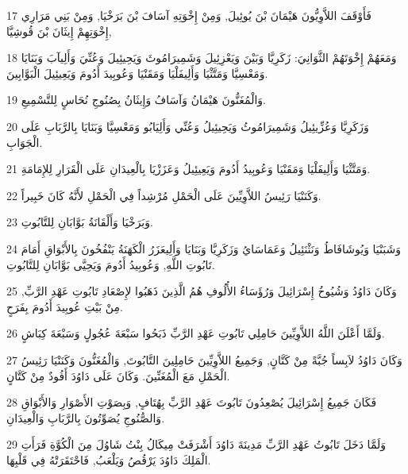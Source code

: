 \par 17 فَأَوْقَفَ اللاَّوِيُّونَ هَيْمَانَ بْنَ يُوئِيلَ, وَمِنْ إِخْوَتِهِ آسَافَ بْنَ بَرَخْيَا, وَمِنْ بَنِي مَرَارِي إِخْوَتِهِمْ إِيثَانَ بْنَ قُوشِيَّا,
\par 18 وَمَعَهُمْ إِخْوَتَهُمْ الثَّوَانِيَ: زَكَرِيَّا وَبَيْنَ وَيَعْزِئِيلَ وَشَمِيرَامُوثَ وَيَحِيئِيلَ وَعُنِّيَ وَأَلِيآبَ وَبَنَايَا وَمَعْسِيَّا وَمَتَّثْيَا وَأَلِيفَلْيَا وَمَقَنْيَا وَعُوبِيدَ أَدُومَ وَيَعِيئِيلَ الْبَوَّابِينَ.
\par 19 وَالْمُغَنُّونَ هَيْمَانُ وَآسَافُ وَإِيثَانُ بِصُنُوجِ نُحَاسٍ لِلتَّسْمِيعِ.
\par 20 وَزَكَرِيَّا وَعُزِّيئِيلُ وَشَمِيرَامُوثُ وَيَحِيئِيلُ وَعُنِّي وَأَلِيَابُو وَمَعْسِيَّا وَبَنَايَا بِالرَّبَابِ عَلَى الْجَوَابِ.
\par 21 وَمَتَّثْيَا وَأَلِيفَلْيَا وَمَقَنْيَا وَعُوبِيدُ أَدُومَ وَيَعِيئِيلُ وَعَزَزْيَا بِالْعِيدَانِ عَلَى الْقَرَارِ لِلإِمَامَةِ.
\par 22 وَكَنَنْيَا رَئِيسُ اللاَّوِيِّينَ عَلَى الْحَمْلِ مُرْشِداً فِي الْحَمْلِ لأَنَّهُ كَانَ خَبِيراً.
\par 23 وَبَرَخْيَا وَأَلْقَانَةُ بَوَّابَانِ لِلتَّابُوتِ.
\par 24 وَشَبَنْيَا وَيُوشَافَاطُ وَنَثْنَئِيلُ وَعَمَاسَايُ وَزَكَرِيَّا وَبَنَايَا وَأَلِيعَزَرُ الْكَهَنَةُ يَنْفُخُونَ بِالأَبْوَاقِ أَمَامَ تَابُوتِ اللَّهِ, وَعُوبِيدُ أَدُومَ وَيَحِيَّى بَوَّابَانِ لِلتَّابُوتِ.
\par 25 وَكَانَ دَاوُدُ وَشُيُوخُ إِسْرَائِيلَ وَرُؤَسَاءُ الأُلُوفِ هُمُ الَّذِينَ ذَهَبُوا لإِصْعَادِ تَابُوتِ عَهْدِ الرَّبِّ, مِنْ بَيْتِ عُوبِيدَ أَدُومَ بِفَرَحٍ.
\par 26 وَلَمَّا أَعْلَنَ اللَّهُ اللاَّوِيِّينَ حَامِلِي تَابُوتِ عَهْدِ الرَّبِّ ذَبَحُوا سَبْعَةَ عُجُولٍ وَسَبْعَةَ كِبَاشٍ.
\par 27 وَكَانَ دَاوُدُ لاَبِساً جُبَّةً مِنْ كَتَّانٍ, وَجَمِيعُ اللاَّوِيِّينَ حَامِلِينَ التَّابُوتَ, وَالْمُغَنُّونَ وَكَنَنْيَا رَئِيسُ الْحَمْلِ مَعَ الْمُغَنِّينَ. وَكَانَ عَلَى دَاوُدَ أَفُودٌ مِنْ كَتَّانٍ.
\par 28 فَكَانَ جَمِيعُ إِسْرَائِيلَ يُصْعِدُونَ تَابُوتَ عَهْدِ الرَّبِّ بِهُتَافٍ, وَبِصَوْتِ الأَصْوَارِ وَالأَبْوَاقِ وَالصُّنُوجِ يُصَوِّتُونَ بِالرَّبَابِ وَالْعِيدَانِ.
\par 29 وَلَمَّا دَخَلَ تَابُوتُ عَهْدِ الرَّبِّ مَدِينَةَ دَاوُدَ أَشْرَفَتْ مِيكَالُ بِنْتُ شَاوُلَ مِنَ الْكُوَّةِ فَرَأَتِ الْمَلِكَ دَاوُدَ يَرْقُصُ وَيَلْعَبُ, فَاحْتَقَرَتْهُ فِي قَلْبِهَا.

